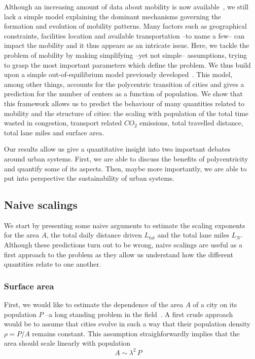 Although an increasing amount of data about mobility is now available~\cite{Gonzalez:2008}, we still lack a simple model explaining the dominant mechanisms governing the formation and evolution of mobility patterns. Many factors such as geographical constraints, facilities location and available transportation --to name a few-- can impact the mobility and it thus appears as an intricate issue. Here, we tackle the problem of mobility by making simplifying --yet not simple-- assumptions, trying to grasp the most important parameters which define the problem. We thus build upon a simple out-of-equilibrium model previously developed~\cite{Louf:2013}. This model, among other things, accounts for the polycentric transition of cities and gives a prediction for the number of centers as a function of population. We show that this framework allows us to predict the behaviour of many quantities related to mobility and the structure of cities: the scaling with population of the total time wasted in congestion, transport related $CO_2$ emissions, total travelled distance, total lane miles and surface area.

Our results allow us give a quantitative insight into two important debates around urban systems. First, we are able to discuss the benefits of polycentricity and quantify some of its aspects. Then, maybe more importantly, we are able to put into perspective the sustainability of urban systems.


\subsection{Naive scalings}

We start by presenting some naive arguments to estimate the scaling exponents for the area $A$, the total daily distance driven $L_{tot}$ and the total lane miles $L_N$. Although these predictions turn out to be wrong, naive scalings are useful as a first approach to the problem as they allow us understand how the different quantities relate to one another.


\subsubsection{Surface area} 

First, we would like to estimate the dependence of the area $A$ of a city on its population $P$ --a long standing problem in the field~\cite{Makse:1995}. A first crude approach would be to assume that cities evolve in such a way that their population density $\rho = P/A$ remains constant. This assumption straighforwardly implies that the area should scale linearly with population
%
\begin{equation}
A \sim \lambda^2\, P
\label{eq:area_naive}
\end{equation}


